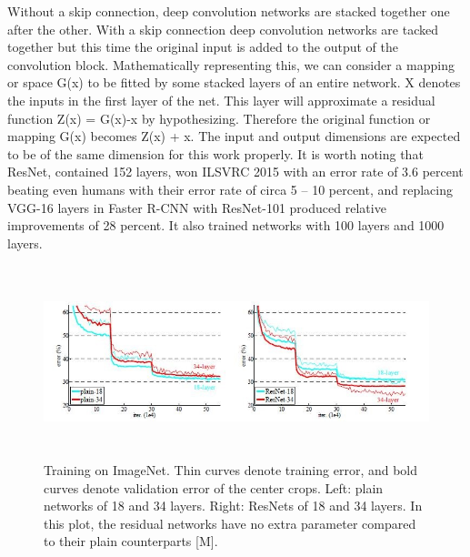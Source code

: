 Without a skip connection, deep convolution networks are stacked together one after the other.  With a skip connection deep convolution networks are tacked together but this time the original input is added to the output of the convolution block.
Mathematically representing this, we can consider a mapping or space G(x) to be fitted by some stacked layers of an entire network.  X denotes the inputs in the first layer of the net. This layer will approximate a residual function Z(x) = G(x)-x by hypothesizing.  Therefore the original function or mapping G(x) becomes Z(x) + x.  The input and output dimensions are expected to be of the same dimension for this work properly.  It is worth noting that ResNet, contained 152 layers, won ILSVRC 2015 with an error rate of 3.6 percent beating even humans with their error rate of circa 5 – 10 percent, and replacing VGG-16 layers in Faster R-CNN with ResNet-101 produced relative improvements of 28 percent. It also trained networks with 100 layers and 1000 layers. 

\begin{figure}[H]
  \includegraphics[height=2.2in]{images/resnet-graph.jpg}
   \caption{Training on ImageNet. Thin curves denote training error, and bold curves denote validation error of the center crops. Left: plain networks of 18 and 34 layers. Right: ResNets of 18 and 34 layers. In this plot, the residual networks have no extra parameter compared to their plain counterparts [M].}
\end{figure}

